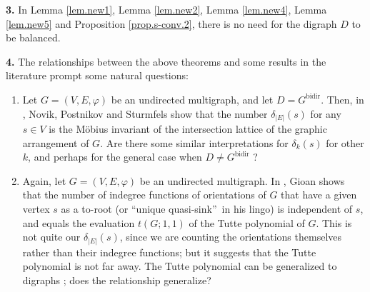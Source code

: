 \documentclass[numbers=enddot,12pt,final,onecolumn,notitlepage]{scrartcl}%
\theoremstyle{definition}
\theoremstyle{plainsl}
\begin{document}
\bigskip

\textbf{3.} In Lemma \ref{lem.new1}, Lemma \ref{lem.new2}, Lemma
\ref{lem.new4}, Lemma \ref{lem.new5} and Proposition \ref{prop.s-conv.2},
there is no need for the digraph $D$ to be balanced.

\bigskip

\textbf{4.} The relationships between the above theorems and some results in
the literature prompt some natural questions:

\begin{enumerate}
\item[\textbf{(a)}] Let $G=\left(  V,E,\varphi\right)  $ be an undirected
multigraph, and let $D=G^{\operatorname*{bidir}}$. Then, in \cite[Proposition
5.3]{NoPoSt02}, Novik, Postnikov and Sturmfels show that the number
$\delta_{\left\vert E\right\vert }\left(  s\right)  $ for any $s\in V$ is the
M\"{o}bius invariant of the intersection lattice of the graphic arrangement of
$G$. Are there some similar interpretations for $\delta_{k}\left(  s\right)  $
for other $k$, and perhaps for the general case when $D\neq
G^{\operatorname*{bidir}}$ ?

\item[\textbf{(b)}] Again, let $G=\left(  V,E,\varphi\right)  $ be an
undirected multigraph. In \cite[Theorem 3.4]{Gioan07}, Gioan shows that the
number of indegree functions of orientations of $G$ that have a given vertex
$s$ as a to-root (or \textquotedblleft unique quasi-sink\textquotedblright\ in
his lingo) is independent of $s$, and equals the evaluation $t\left(
G;1,1\right)  $ of the Tutte polynomial of $G$. This is not quite our
$\delta_{\left\vert E\right\vert }\left(  s\right)  $, since we are counting
the orientations themselves rather than their indegree functions; but it
suggests that the Tutte polynomial is not far away. The Tutte polynomial can be
generalized to digraphs \cite{AwaBer18}; does the relationship generalize?
\end{enumerate}
\end{document}
